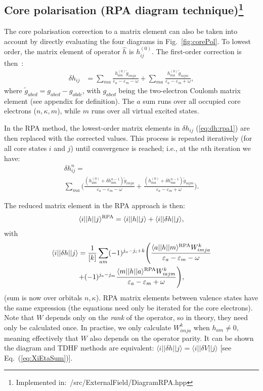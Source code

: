 \documentclass[10pt,twocolumn,a4paper]{article}%
\newcommand{\bra}[1]{\ensuremath{\langle #1|}}	%
\newcommand{\ket}[1]{\ensuremath{|#1\rangle}}	%
\newcommand{\be}{\begin{equation}}
\newcommand{\ee}{\end{equation}}
\def\en{\ensuremath{\varepsilon}}
\renewcommand{\k}{\ensuremath{\kappa}}
\begin{document}
\subsection[Core polarisation (RPA diagram technique)]{Core polarisation (RPA diagram technique)\footnote{Implemented in:~/src/ExternalField/DiagramRPA.hpp}\label{sec:RPA-diagram}}

The core polarisation correction to a matrix element can also be taken into account by directly evaluating the four diagrams in Fig.~\ref{fig:corePol}.
To lowest order, the matrix element of operator $\hat h$ is $h_{ij}^{(0)}$.
The first-order correction is then~\cite{Lindgren1986}:
\begin{align}
\delta h_{ij} &=
\sum_{ma}\frac{h_{am}^{(0)}\widetilde g_{imja}}{\en_a - \en_m - \omega}
+ \sum_{ma}\frac{h_{ma}^{(0)}\widetilde g_{iajm}}{\en_a - \en_m + \omega},
\label{eq:dh:rpa1}
\end{align}
where
$ \widetilde g_{abcd} =  g_{abcd} -  g_{abdc}$, with
$g_{abcd}$ being the two-electron Coulomb matrix element (see appendix for definition).
The $a$ sum runs over all occupied core electrons ($n,\k,m$), while $m$ runs over all virtual excited states.

In the RPA method, the lowest-order matrix elements in $\delta h_{ij}$ (\ref{eq:dh:rpa1}) are then replaced with the corrected values. This process is repeated iteratively (for all core states $i$ and $j$) until convergence is reached; i.e., at the $n$th iteration we have:
\begin{multline}
\delta h_{ij}^{n} = \\
\sum_{ma}\Bigg(\frac{(h_{am}^{(0)}+\delta h_{am}^{n-1})\widetilde g_{imja}}{\en_a - \en_m - \omega}
+ \frac{(h_{ma}^{(0)}+\delta h_{ma}^{n-1})\widetilde g_{iajm}}{\en_a - \en_m + \omega}\Bigg).
\end{multline}

The reduced matrix element in the RPA approach is then:
\be
\bra{i}|h|\ket{j}^{\rm RPA} = \bra{i}|h|\ket{j} + \bra{i}|\delta h|\ket{j},
\ee
with
\begin{multline}
\bra{i}|\delta h|\ket{j} =
\frac{1}{[k]}\sum_{am}(-1)^{j_a-j_i+k}\Bigg(
 \frac{\bra{a}|h|\ket{m}^{\rm RPA}W^k_{imja}}{\en_a-\en_m-\omega}\\
+ (-1)^{j_a-j_m}\frac{\bra{m}|h|\ket{a}^{\rm RPA}W^k_{iajm}}{\en_a-\en_m+\omega}
\Bigg),
\end{multline}
(sum is now over {\rm orbitals $n,\k$}).
RPA matrix elements between valence states have the same expression (the equations need only be iterated for the core electrons).
Note that $W$ depends only on the {\em rank} of the operator, so in theory, they need only be calculated once.
In practise, we only calculate $W^k_{imja}$ when $h_{am}\neq0$, meaning effectively that $W$ also depends on the operator parity.
It can be shown the diagram and TDHF methods are equivalent:
 $\bra{i}|\delta h|\ket{j}=\bra{i}|\delta V|\ket{j}$ [see Eq.~(\ref{eq:XiEtaSum})].
\end{document}
